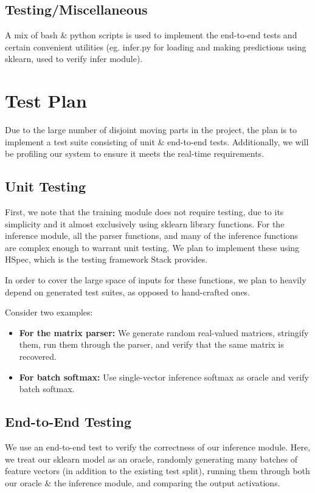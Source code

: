 \documentclass[12pt]{article}
\begin{document}
\subsection{Testing/Miscellaneous}
A mix of bash \& python scripts is used to implement the end-to-end tests and certain convenient utilities (eg. infer.py for loading and making predictions using sklearn, used to verify infer module). 

\section{Test Plan}
Due to the large number of disjoint moving parts in the project, the plan is to implement a test suite consisting of unit \& end-to-end tests. Additionally, we will be profiling our system to ensure it meets the real-time requirements.

\subsection{Unit Testing}
First, we note that the training module does not require testing, due to its simplicity and it almost exclusively using sklearn library functions. For the inference module, all the parser functions, and many of the inference functions are complex enough to warrant unit testing. We plan to implement these using HSpec, which is the testing framework Stack provides.\bigskip

In order to cover the large space of inputs for these functions, we plan to heavily depend on generated test suites, as opposed to hand-crafted ones.

Consider two examples:
\begin{itemize}
	\item \textbf{For the matrix parser:} We generate random real-valued matrices, stringify them, run them through the parser, and verify that the same matrix is recovered.
	\item \textbf{For batch softmax:} Use single-vector inference softmax as oracle and verify batch softmax.
\end{itemize}

\subsection{End-to-End Testing}
We use an end-to-end test to verify the correctness of our inference module. Here, we treat our sklearn model as an oracle, randomly generating many batches of feature vectors (in addition to the existing test split), running them through both our oracle \& the inference module, and comparing the output activations.
\end{document}
